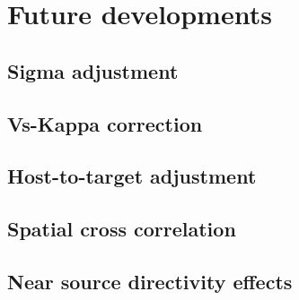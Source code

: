 %
\section{Future developments}
%
\subsection{Sigma adjustment}
%
\subsection{Vs-Kappa correction}
%
\subsection{Host-to-target adjustment}
%
\subsection{Spatial cross correlation}
%
\subsection{Near source directivity effects}

